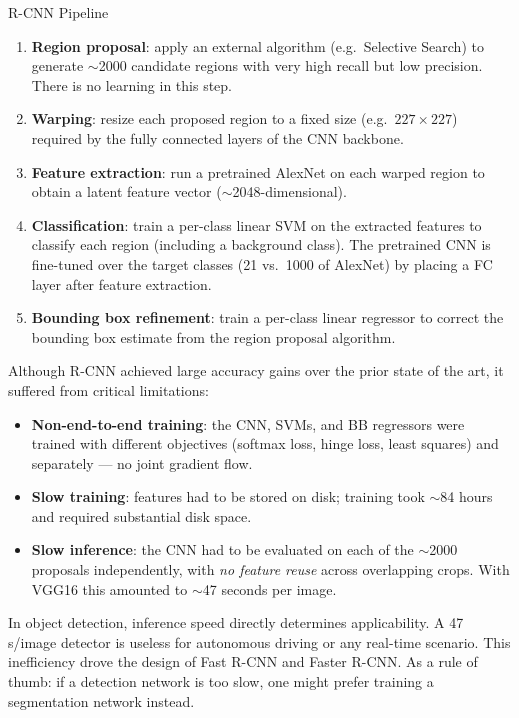 \documentclass[11pt,a4paper]{article}
\begin{document}
\begin{thmbox}{R-CNN Pipeline}
\begin{enumerate}
  \item \textbf{Region proposal}: apply an external algorithm (e.g.\ Selective Search) to generate $\sim$2000 candidate regions with very high recall but low precision. There is no learning in this step.
  \item \textbf{Warping}: resize each proposed region to a fixed size (e.g.\ $227 \times 227$) required by the fully connected layers of the CNN backbone.
  \item \textbf{Feature extraction}: run a pretrained AlexNet on each warped region to obtain a latent feature vector ($\sim$2048-dimensional).
  \item \textbf{Classification}: train a per-class linear SVM on the extracted features to classify each region (including a background class). The pretrained CNN is fine-tuned over the target classes (21 vs.\ 1000 of AlexNet) by placing a FC layer after feature extraction.
  \item \textbf{Bounding box refinement}: train a per-class linear regressor to correct the bounding box estimate from the region proposal algorithm.
\end{enumerate}
\end{thmbox}

Although R-CNN achieved large accuracy gains over the prior state of the art, it suffered from critical limitations:
\begin{itemize}
  \item \textbf{Non-end-to-end training}: the CNN, SVMs, and BB regressors were trained with different objectives (softmax loss, hinge loss, least squares) and separately — no joint gradient flow.
  \item \textbf{Slow training}: features had to be stored on disk; training took $\sim$84 hours and required substantial disk space.
  \item \textbf{Slow inference}: the CNN had to be evaluated on each of the $\sim$2000 proposals independently, with \emph{no feature reuse} across overlapping crops. With VGG16 this amounted to $\sim$47 seconds per image.
\end{itemize}

\begin{warnbox}
In object detection, inference speed directly determines applicability. A 47 s/image detector is useless for autonomous driving or any real-time scenario. This inefficiency drove the design of Fast R-CNN and Faster R-CNN. As a rule of thumb: if a detection network is too slow, one might prefer training a segmentation network instead.
\end{warnbox}
\end{document}
